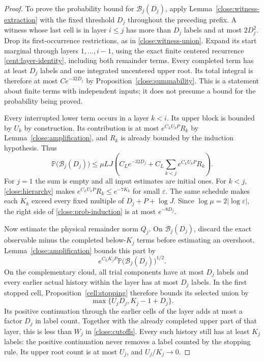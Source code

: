 \begin{proof}
To prove the probability bound for $\mathcal B_j(D_j)$, apply
Lemma~\ref{close:witness-extraction} with the fixed threshold
$D_j$ throughout the preceding prefix. A witness whose last cell
is in layer $i\leq j$ has more than $D_j$ labels and at most
$2D_j^2$. Drop its first-occurrence restrictions, as in
\eqref{close:witness-union}. Expand its start marginal through
layers $1,\ldots,i-1$, using the exact finite centered recurrence
\eqref{cent:layer-identity}, including both remainder terms.
Every completed term has at least $D_j$
labels and one integrated uncentered upper root. Its total
integral is therefore at most $C e^{-32D_j}$ by
Proposition~\ref{close:summability}. This is a statement about
finite terms with independent inputs; it does not presume a
bound for the probability being proved.

Every interrupted lower term occurs in a layer $k<i$. Its
upper block is bounded by $U_k$ by construction. Its contribution
is at most $e^{C_LU_kP}R_k$ by
Lemma~\ref{close:amplification}, and $R_k$ is already bounded
by the induction hypothesis. Thus
\begin{equation}\label{close:prob-induction}
 \mathbb P\bigl(\mathcal B_j(D_j)\bigr)
 \leq \mu LJ\left(
 C_L e^{-32D_j}
 +C_L\sum_{k<j}e^{C_LU_kP}R_k\right).
\end{equation}
For $j=1$ the sum is empty and all input estimates are initial
ones. For $k<j$, \eqref{close:hierarchy} makes
$e^{C_LU_kP}R_k\leq e^{-7K_k}$ for small
$\varepsilon$. The same schedule makes each $K_k$ exceed every
fixed multiple of $D_j+P+\log J$. Since
$\log\mu=2|\log\varepsilon|$, the right side of
\eqref{close:prob-induction} is at most $e^{-8D_j}$.

Now estimate the physical remainder norm $Q_j$. On
$\mathcal B_j(D_j)$, discard the exact observable minus the
completed below-$K_j$ terms before estimating an overshoot.
Lemma~\ref{close:amplification} bounds this part by
\begin{equation}\label{close:own-bad-cost}
 e^{C_LK_jP}
 \mathbb P\bigl(\mathcal B_j(D_j)\bigr)^{1/2}.
\end{equation}
On the complementary cloud, all trial components have at most
$D_j$ labels and every earlier actual history within the layer
has at most $D_j$ labels. In the first stopped cell,
Proposition~\ref{cell:stopping} therefore bounds its selected
union by
\[
 \max\{U_jD_j,K_j-1+D_j\}.
\]
Its positive continuation through the earlier cells of the layer
adds at most a factor $D_j$ in label count. Together with the
already completed upper part of that layer, this is less than
$W_j$ in \eqref{close:cutoffs}. Every such history still has at
least $K_j$ labels: the positive continuation never removes a
label counted by the stopping rule. Its upper root count is at
most $U_j$, and $U_j/K_j\to0$.


\end{proof}
